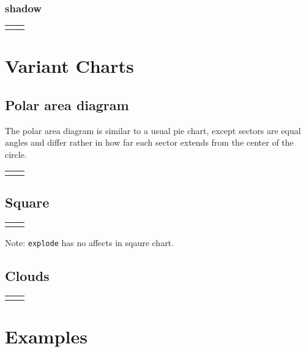 \documentclass{article}
\newcommand{\demo}[2][1]{
  \begin{center}
  \begin{tabular}{cc}
    \begin{minipage}{.49\linewidth}
      \centering
      \resizebox{#1\linewidth}{!}{
        
      }
    \end{minipage}
    &
    \begin{minipage}{.45\linewidth}
      
    \end{minipage}
  \end{tabular}
  \end{center}
}
\newcommand{\example}[2][1]{
  \begin{center}  
    \resizebox{#1\linewidth}{!}{
      
    }
  \end{center}
  
}
\begin{document}
\subsubsection{shadow}
\demo[0.6]{shadow}

\section{Variant Charts}
\subsection{Polar area diagram}
The polar area diagram is similar to a usual pie chart, except sectors
are equal angles and differ rather in how far each sector extends from
the center of the circle.

\demo[0.6]{polar}

\subsection{Square}

\demo[0.6]{square}

Note: \texttt{explode} has no affects in sqaure chart.

\subsection{Clouds}

\demo[0.6]{cloud}

\section{Examples}


\end{document}

